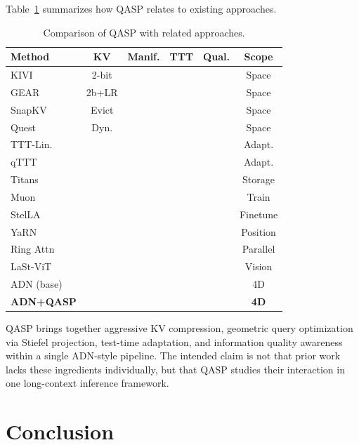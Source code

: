\documentclass[twocolumn]{article}
\newcommand{\cmark}{\ding{51}}
\newcommand{\xmark}{\ding{55}}
\begin{document}
Table~\ref{tab:comparison} summarizes how QASP relates to existing approaches.

\begin{table}[htbp]
\centering
\caption{Comparison of QASP with related approaches.}
\label{tab:comparison}
\small
\begin{tabular}{lccccc}
\toprule
\textbf{Method} & \textbf{KV} & \textbf{Manif.} & \textbf{TTT} & \textbf{Qual.} & \textbf{Scope} \\
\midrule
KIVI~\cite{kivi} & 2-bit & \xmark & \xmark & \xmark & Space \\
GEAR~\cite{gearkv} & 2b+LR & \xmark & \xmark & \xmark & Space \\
SnapKV~\cite{snapkv} & Evict & \xmark & \xmark & \xmark & Space \\
Quest~\cite{quest} & Dyn. & \xmark & \xmark & \xmark & Space \\
TTT-Lin.~\cite{tttlinear} & \xmark & \xmark & \cmark & \xmark & Adapt. \\
qTTT~\cite{qttt} & \xmark & \xmark & \cmark & \xmark & Adapt. \\
Titans~\cite{titans} & \xmark & \xmark & \cmark & \xmark & Storage \\
Muon~\cite{muon} & \xmark & \cmark & \xmark & \xmark & Train \\
StelLA~\cite{stella} & \xmark & \cmark & \xmark & \xmark & Finetune \\
YaRN~\cite{yarn} & \xmark & \xmark & \xmark & \xmark & Position \\
Ring Attn~\cite{ringattention} & \xmark & \xmark & \xmark & \xmark & Parallel \\
LaSt-ViT~\cite{lastvit} & \xmark & \xmark & \xmark & \cmark & Vision \\
\midrule
ADN (base) & \cmark & \xmark & \cmark & \xmark & 4D \\
\textbf{ADN+QASP} & \cmark & \cmark & \cmark & \cmark & \textbf{4D} \\
\bottomrule
\end{tabular}
\end{table}

QASP brings together aggressive KV compression, geometric query optimization via Stiefel projection, test-time adaptation, and information quality awareness within a single ADN-style pipeline. The intended claim is not that prior work lacks these ingredients individually, but that QASP studies their interaction in one long-context inference framework.

\section{Conclusion}
\label{sec:conclusion}
\end{document}
